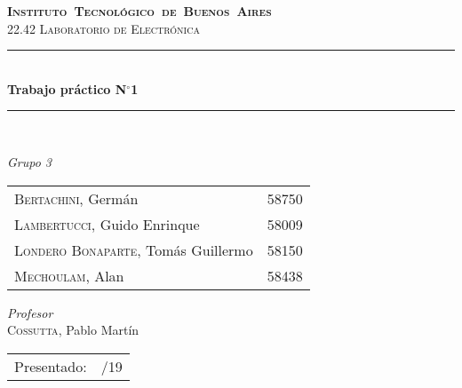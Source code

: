 \begin{titlepage}

\newcommand{\HRule}{\rule{\linewidth}{0.5mm}}
\center
\mbox{\textsc{\LARGE \bfseries {Instituto Tecnológico de Buenos Aires}}}\\[1.5cm]
\textsc{\Large 22.42 Laboratorio de Electrónica}\\[0.5cm]


\HRule \\[0.6cm]
{ \Huge \bfseries Trabajo práctico N$^{\circ}$1}\\[0.4cm] 
\HRule \\[1.5cm]


{\large

\emph{Grupo 3}\\
\vspace{3px}

\begin{tabular}{lr} 	
\textsc{Bertachini}, Germán  & 58750 \\ 	
\textsc{Lambertucci}, Guido Enrinque  & 58009 \\
\textsc{Londero Bonaparte}, Tomás Guillermo  & 58150 \\
\textsc{Mechoulam}, Alan  &  58438\\
\end{tabular}

\vspace{20px}

\emph{Profesor}\\
\vspace{3px}
\textsc{Cossutta}, Pablo Martín\\	

\vspace{100px}

\begin{tabular}{ll}

Presentado: & /19\\

\end{tabular}

}

\vfill

\end{titlepage}

